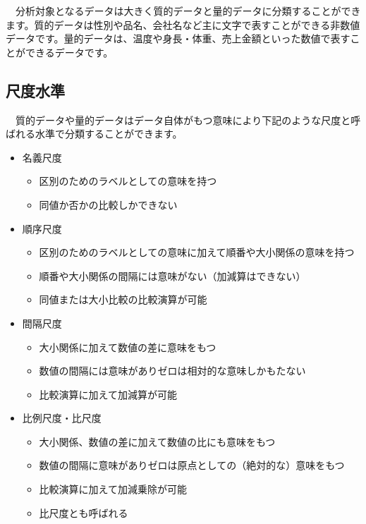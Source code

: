 \documentclass[
  12pt,
]{book}
\providecommand{\tightlist}{%
  \setlength{\itemsep}{0pt}\setlength{\parskip}{0pt}}
\begin{document}
　分析対象となるデータは大きく質的データと量的データに分類することができます。質的データは性別や品名、会社名など主に文字で表すことができる非数値データです。量的データは、温度や身長・体重、売上金額といった数値で表すことができるデータです。

\hypertarget{ux5c3aux5ea6ux6c34ux6e96}{%
\subsection{\texorpdfstring{尺度水準}{尺度水準}}\label{ux5c3aux5ea6ux6c34ux6e96}}

　質的データや量的データはデータ自体がもつ意味により下記のような尺度と呼ばれる水準で分類することができます。

\begin{itemize}
\tightlist
\item
  名義尺度

  \begin{itemize}
  \tightlist
  \item
    区別のためのラベルとしての意味を持つ
  \item
    同値か否かの比較しかできない
  \end{itemize}
\item
  順序尺度

  \begin{itemize}
  \tightlist
  \item
    区別のためのラベルとしての意味に加えて順番や大小関係の意味を持つ
  \item
    順番や大小関係の間隔には意味がない（加減算はできない）
  \item
    同値または大小比較の比較演算が可能
  \end{itemize}
\item
  間隔尺度

  \begin{itemize}
  \tightlist
  \item
    大小関係に加えて数値の差に意味をもつ
  \item
    数値の間隔には意味がありゼロは相対的な意味しかもたない
  \item
    比較演算に加えて加減算が可能
  \end{itemize}
\item
  比例尺度・比尺度

  \begin{itemize}
  \tightlist
  \item
    大小関係、数値の差に加えて数値の比にも意味をもつ
  \item
    数値の間隔に意味がありゼロは原点としての（絶対的な）意味をもつ
  \item
    比較演算に加えて加減乗除が可能
  \item
    比尺度とも呼ばれる
  \end{itemize}
\end{itemize}
\end{document}
